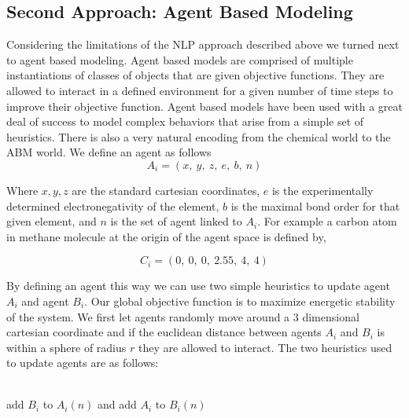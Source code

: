 \documentclass[aps,floatfix,prd,showpacs]{revtex4}
\begin{document}
\subsection{Second Approach: Agent Based Modeling }
Considering the limitations of the NLP approach described above we turned next to agent based modeling. Agent based models are comprised of multiple instantiations of classes of objects that are given objective functions. They are allowed to interact in a defined environment for a given number of time steps to improve their objective function. \cite{abm} Agent based models have been used with a great deal of success to model complex behaviors that arise from a simple set of heuristics. There is also a very natural encoding from the chemical world to the ABM world. We define an agent as follows
$$A_i = (x, \ y, \ z, \ e, \ b, \ n)$$

Where $x,y,z$ are the standard cartesian coordinates, $e$ is the experimentally determined electronegativity of the element, $b$ is the maximal bond order for that given element, and $n$ is the set of agent linked to $A_i$. For example a carbon atom in methane molecule at the origin of the agent space is defined by,

$$C_i = (0, \ 0, \ 0, \ 2.55, \ 4, \ 4)$$

By defining an agent this way we can use two simple heuristics to update agent $A_i$ and agent $B_i$. Our global objective function is to maximize energetic stability of the system. We first let agents randomly move around a 3 dimensional cartesian coordinate and if the euclidean distance between agents $A_i$ and $B_i$ is within a sphere of radius $r$ they are allowed to interact. The two heuristics used to update agents are as follows: 
\\
\\
  \begin{algorithmic}
  
  { add $B_i$ to $A_i(n)$ and add $A_i$ to $B_i(n)$  }
\EndIf
{}
\EndIf

\end{algorithmic}
\end{document}
